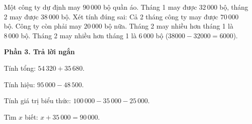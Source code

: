 \begin{ex} %
Một công ty dự định may $90\,000$ bộ quần áo. Tháng 1 may được $32\,000$ bộ, tháng 2 may được $38\,000$ bộ. Xét tính đúng sai:
\choiceTF
{\True Cả 2 tháng công ty may được $70\,000$ bộ.}
{\True Công ty còn phải may $20\,000$ bộ nữa.}
{Tháng 2 may nhiều hơn tháng 1 là $8\,000$ bộ.}
{\True Tháng 2 may nhiều hơn tháng 1 là $6\,000$ bộ ($38000 - 32000 = 6000$).}
\end{ex}

\textbf{Phần 3. Trả lời ngắn}

\begin{ex} %
Tính tổng: $54\,320 + 35\,680$.
\end{ex}

\begin{ex} %
Tính hiệu: $95\,000 - 48\,500$.
\end{ex}

\begin{ex} %
Tính giá trị biểu thức: $100\,000 - 35\,000 - 25\,000$.
\end{ex}

\begin{ex} %
Tìm $x$ biết: $x + 35\,000 = 90\,000$.
\end{ex}

